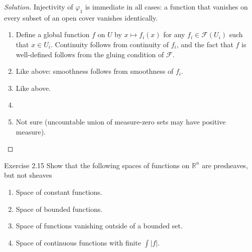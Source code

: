 \begin{proof}[Solution]\leavevmode
Injectivity of $\varphi_1$ is immediate in all cases: a function that vanishes on every subset of an open cover vanishes identically.
\begin{enumerate}[label=(\alph*)]
\item Define a global function $f$ on $U$ by  $x \mapsto f_i(x)$ for any $f_i \in \mathcal{F}(U_i)$ such that $x \in U_i$. Continuity follows from continuity of $f_i$, and the fact that $f$ is well-defined follows from the gluing condition of $\mathcal{F}$.

\item Like above: smoothness follows from smoothness of $f_i$.

\item Like above.

\item 

\item {\color{2}Not sure} (uncountable union of measure-zero sets may have positive measure).
\end{enumerate}
\end{proof}

\begin{thing4}{Exercise 2.15}\label{exer:2.15}\leavevmode
Show that the following spaces of functions on $\mathbb{R}^n$ are presheaves, but not sheaves
\begin{enumerate}[label=(\alph*)]
\item Space of constant functions.
\item Space of bounded functions.
\item Space of functions vanishing outside of a bounded set.
\item Space of continuous functions with finite  $\int |f|$.
\end{enumerate}
\end{thing4}

